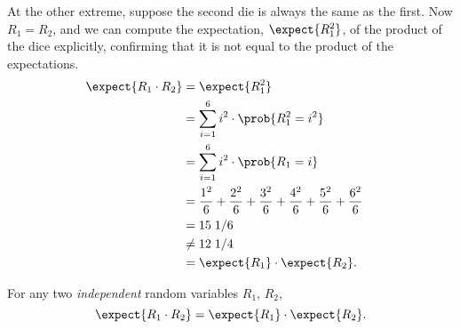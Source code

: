 At the other extreme, suppose the second die is always the same as the
first.  Now $R_1 = R_2$, and we can compute the expectation,
$\expect{R_1^2}$, of the product of the dice explicitly, confirming that
it is not equal to the product of the expectations.
\begin{align*}
\expect{R_1 \cdot R_2} & = \expect{R_1^2}\\
        & =    \sum_{i=1}^6 i^2 \cdot \prob{R_{1}^2 = i^2}
                    &  \\
        & =    \sum_{i=1}^6 i^2 \cdot \prob{R_{1} = i}\\
        & =    \frac{1^2}{6} + \frac{2^2}{6} + \frac{3^2}{6} +
                \frac{4^2}{6} + \frac{5^2}{6} + \frac{6^2}{6} \\
        & =   15\; 1/6\\
        & \neq  12 \; 1/4\\
        & = \expect{R_1} \cdot \expect{R_2}.
\end{align*}
\iffalse & \text{from \eqref{R1R2}}\fi

\begin{theorem}\label{th:prod}
For any two \emph{independent} random variables $R_1$, $R_2$,
\[
\expect{R_1 \cdot R_2} = \expect{R_1} \cdot \expect{R_2}.
\]
\end{theorem}

